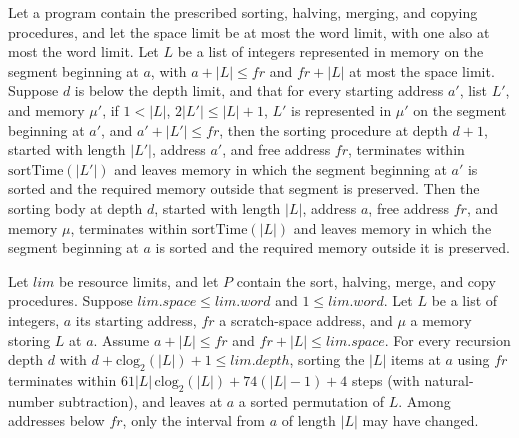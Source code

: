 \begin{theorem}
\label{Light.MergeSort.body_ends}
\leanok
{}
Let a program contain the prescribed sorting, halving, merging, and copying procedures,
and let the space limit be at most the word limit, with one also at most the word limit.
Let $L$ be a list of integers represented in memory on the segment beginning at $a$,
with $a+|L|\le fr$ and $fr+|L|$ at most the space limit. Suppose $d$ is below the depth
limit, and that for every starting address $a'$, list $L'$, and memory $\mu'$, if
$1<|L|$, $2|L'|\le |L|+1$, $L'$ is represented in $\mu'$ on the segment beginning at
$a'$, and $a'+|L'|\le fr$, then the sorting procedure at depth $d+1$, started with
length $|L'|$, address $a'$, and free address $fr$, terminates within
$\mathrm{sortTime}(|L'|)$ and leaves memory in which the segment beginning at $a'$ is
sorted and the required memory outside that segment is preserved. Then the sorting body
at depth $d$, started with length $|L|$, address $a$, free address $fr$, and memory
$\mu$, terminates within $\mathrm{sortTime}(|L|)$ and leaves memory in which the segment
beginning at $a$ is sorted and the required memory outside it is preserved.
\end{theorem}

\begin{theorem}
\label{Light.sort_meets}
\leanok
{}
Let $lim$ be resource limits, and let $P$ contain the sort, halving, merge, and copy procedures.
Suppose $lim.space\le lim.word$ and $1\le lim.word$. Let $L$ be a list of integers,
$a$ its starting address, $fr$ a scratch-space address, and $\mu$ a memory storing $L$
at $a$. Assume $a+|L|\le fr$ and $fr+|L|\le lim.space$. For every recursion depth $d$
with $d+\mathrm{clog}_2(|L|)+1\le lim.depth$, sorting the $|L|$ items at $a$ using
$fr$ terminates within
$61|L|\,\mathrm{clog}_2(|L|)+74(|L|-1)+4$ steps (with natural-number subtraction),
and leaves at $a$ a sorted permutation of $L$. Among addresses below $fr$, only the
interval from $a$ of length $|L|$ may have changed.
\end{theorem}
